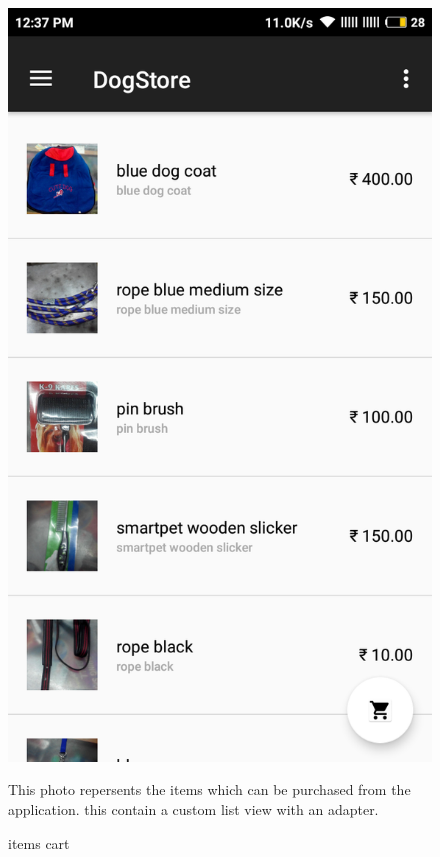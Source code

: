 \begin{figure}[ht]
\centering
\includegraphics[scale=0.30]{images/g1.png}
\caption{items cart}

This photo repersents the items which can be purchased from the application. this contain a custom list view with an adapter.

\end{figure}

\newpage

